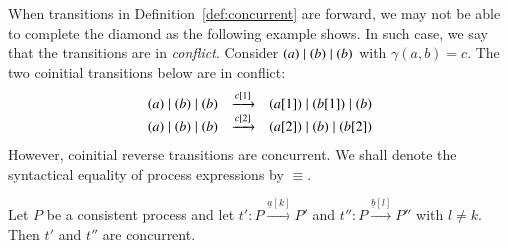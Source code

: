When transitions in Definition~\ref{def:concurrent} are forward, we may not be able to complete the diamond
as the following example shows. In such case, we say that the transitions are in \emph{conflict}.
Consider $ (a) \; \vert \; (b) \; \vert \; (b)$ with $\gamma(a,b) = c$. The two coinitial
transitions below are in conflict:
\renewcommand{\arraystretch}{1}
$$\begin{array}{lll}
	(a) \; \vert \; (b) \; \vert \; (b) & \xrightarrow{c[1]} & (a[1]) \; \vert \; (b[1]) \; \vert \; (b) \\
	(a) \; \vert \; (b) \; \vert \; (b) & \xrightarrow{c[2]} & (a[2])\; \vert \; (b)
	\; \vert \; (b[2])
\end{array}$$
However, coinitial reverse transitions are concurrent. We shall denote the syntactical equality 
of process expressions by $\equiv$. 

\begin{proposition}\label{prop:revdiamond} 
Let $P$ be a consistent process and let
$t': P \xrightarrow{\underline{a}[k]} P'$ and $t'': P \xrightarrow{\underline{b}[l]} P''$ 
with $l \neq k $.  Then $t'$ and $t''$ are concurrent.
\end{proposition}

